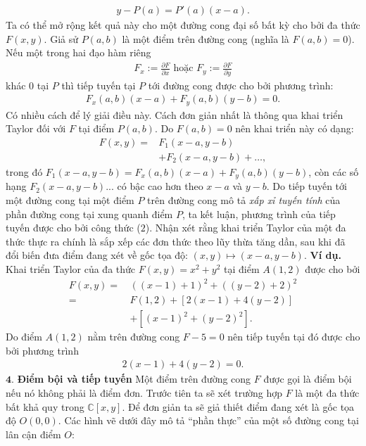 \begin{multicols}{2}
\begin{align*}
		y-P(a)=P'(a)(x-a).
	\end{align*}
	Ta có thể mở rộng kết quả này cho một đường cong đại số bất kỳ cho bởi đa thức $F(x,y)$. Giả sử $P(a,b)$ là một điểm trên đường cong (nghĩa là $F(a,b)=0$). Nếu một trong hai đạo hàm riêng 
	\begin{align*}
		F_x:=\frac{\partial F}{\partial x} \textrm{ hoặc } F_y:=\frac{\partial F}{\partial y}
	\end{align*}
	khác $0$ tại $P$ thì tiếp tuyến tại $P$ tới đường cong được cho bởi phương trình:
	\begin{align*}
		F_x(a,b)(x-a)+F_y(a,b) (y-b)=0. \tag{$2$}
	\end{align*}
	Có nhiều cách để lý giải điều này. Cách đơn giản nhất là thông qua khai triển Taylor đối với $F$ tại điểm $P(a,b)$. Do $F(a,b)=0$ nên khai triển này có dạng:
	\begin{align*}
		F(x,y)=&F_1(x-a,y-b)\\
		&+F_2(x-a,y-b)+\ldots,
	\end{align*}
	trong đó $F_1(x-a,y-b)= F_x(a,b)(x-a)+F_y(a,b)(y-b)$, còn các số hạng $F_2(x-a,y-b)$... có bậc cao hơn theo $x-a$ và $y-b$.  Do tiếp tuyến tới một đường cong tại một điểm $P$ trên đường cong mô tả \textit{xấp xỉ tuyến tính} của phần đường cong tại xung quanh điểm $P$, ta kết luận, phương trình của tiếp tuyến được cho bởi công thức ($2$).
	\vskip 0.1cm
	Nhận xét rằng khai triển Taylor của một đa thức thực ra chính là sắp xếp các đơn thức theo lũy thừa tăng dần, sau khi đã đổi biến đưa điểm đang xét về gốc tọa độ: $(x,y)\mapsto (x-a,y-b)$. 
	\vskip 0.1cm
	\vskip 0.1cm
	\textbf{\color{duongvaotoanhoc}Ví dụ.} Khai triển Taylor của đa thức 
	$F(x,y)=x^2+y^2$ 
	tại điểm $A(1,2)$ được cho bởi
	\begin{align*}
		F(x,y)=\,&((x-1)+1)^2+((y-2)+2)^2\\
		=\,&F(1,2)+[2(x-1)+4(y-2)]\\
		&+[(x-1)^2+(y-2)^2].
	\end{align*}
	Do điểm $A(1,2)$ nằm trên đường cong $F-5=0$ nên tiếp tuyến tại đó được cho bởi phương trình
	\begin{align*}
		2(x-1)+4(y-2)=0.
	\end{align*}
	$\pmb{4.}$ \textbf{\color{duongvaotoanhoc}Điểm bội và tiếp tuyến}
	\vskip 0.1cm 
	Một điểm trên đường cong $F$  được gọi là điểm bội nếu nó không phải là điểm đơn. Trước tiên ta sẽ xét trường hợp $F$ là một đa thức bất khả quy trong $\mathbb C[x,y]$. Để đơn giản ta sẽ giả thiết điểm đang xét là gốc tọa độ $O(0,0)$. Các hình vẽ dưới đây mô tả ``phần thực'' của một số đường cong tại lân cận điểm $O$:

\end{multicols}
